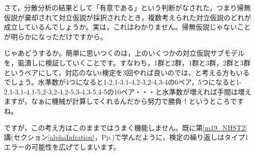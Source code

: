 \documentclass{ltjbook}
\begin{document}
			さて，分散分析の結果として「有意である」という判断がなされた，つまり帰無仮説が棄却されて対立仮説が採択されたとき，複数考えられた対立仮説のどれが成立しているんでしょうか。実は，これはわかりません。帰無仮説じゃないことが明らかになっただけですから。

			じゃあどうするか。簡単に思いつくのは，上のいくつかの対立仮説サブモデルを，虱潰しに検証していくことです。すなわち，1群と2群，1群と3群，2群と3群というペアにして，対応のない$t$検定を3回やれば良いのでは，と考える方もいるでしょう。水準数が4つになると1-2,1-3,1-4,2-3,2-4,3-4の6ペア，5つになると1-2,1-3,1-4,1-5,2-3,2-4,2-5,3-4,3-5,4-5の10ペア・・・と水準数が増えれば手間は増えますが，なぁに機械が計算してくれるんだから努力で勝負！というところですね。

			ですが，この考え方はこのままではうまく機能しません。既に第\ref{m19_NHST2}講(セクション\ref{alphaInfration}，Pp.\pageref{alphaInfration})で学んだように，検定の繰り返しはタイプ1エラーの可能性を広げてしまいます。

\end{document}
